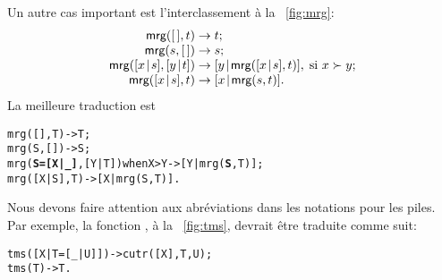 \noindent Un autre cas important est l'interclassement à la
\fig~\vref{fig:mrg}:
\begin{equation*}
\begin{array}{@{}r@{\;}l@{\;}l@{}}
\fun{mrg}(\el,t)         & \rightarrow & t;\\
\fun{mrg}(s,\el)         & \rightarrow & s;\\
\fun{mrg}(\cons{x}{s},\cons{y}{t}) & \rightarrow
& \cons{y}{\fun{mrg}(\cons{x}{s},t)},\;\text{si \(x \succ y\)};\\
\fun{mrg}(\cons{x}{s},t) & \rightarrow
                         & \cons{x}{\fun{mrg}(s,t)}.
\end{array}
\end{equation*}
La meilleure traduction est
\begin{alltt}
mrg(     [],    T)            -> T;
mrg(     S,    [])            -> S;
mrg(\textbf{S=[X|\_]},[Y|T]) when X > Y -> [Y|mrg(\textbf{S},T)];
mrg(  [X|S],    T)            -> [X|mrg(S,T)].
\end{alltt}
Nous devons faire attention aux abréviations dans les notations pour
les piles. Par exemple, la fonction , à la
\fig~\vref{fig:tms}, devrait être traduite comme suit:
\begin{alltt}
tms([X|T=[\_|U]]) -> cutr([X],T,U);
tms(          T) -> T.
\end{alltt}

